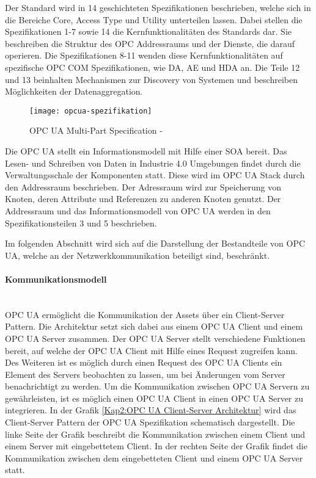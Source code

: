 Der Standard wird in 14 geschichteten Spezifikationen beschrieben, welche sich in die Bereiche Core, Access Type und Utility unterteilen lassen. Dabei stellen die Spezifikationen 1-7 sowie 14 die Kernfunktionalitäten des Standards dar. Sie beschreiben die Struktur des OPC Addressraums und der Dienste, die darauf operieren. Die Spezifikationen 8-11 wenden diese Kernfunktionalitäten auf spezifische OPC COM Spezifikationen, wie \ac{DA}, \ac{AE} und \ac{HDA} an. Die Teile 12 und 13 beinhalten Mechanismen zur Discovery von Systemen und beschreiben Möglichkeiten der Datenaggregation.

\begin{figure}[h]
  \centering
  \texttt{[image: opcua-spezifikation]}
  \caption{OPC UA Multi-Part Specification - \cite{opcpt1}} 
  \label{Kap2:OPC UA Multi-Part Specification}
\end{figure}

\clearpage

Die \ac{OPC UA} stellt ein Informationsmodell mit Hilfe einer \ac{SOA} bereit. Das Lesen- und Schreiben von Daten in Industrie 4.0 Umgebungen findet durch die Verwaltungsschale der Komponenten statt. Diese wird im \ac{OPC UA} Stack durch den Addressraum beschrieben. Der Adressraum wird zur Speicherung von Knoten, deren Attribute und Referenzen zu anderen Knoten genutzt. Der Addressraum und das Informationsmodell von \ac{OPC UA} werden in den Spezifikationsteilen 3 \cite{opcpc3} und 5 \cite{opcpt5} beschrieben.

Im folgenden Abschnitt wird sich auf die Darstellung der Bestandteile von \ac{OPC UA}, welche an der Netzwerkkommunikation beteiligt sind, beschränkt.

\paragraph{Kommunikationsmodell}\mbox{}\\
\ac{OPC UA} ermöglicht die Kommunikation der Assets über ein Client-Server Pattern. Die Architektur setzt sich dabei aus einem \ac{OPC UA} Client und einem \ac{OPC UA} Server zusammen. Der \ac{OPC UA} Server stellt verschiedene Funktionen bereit, auf welche der \ac{OPC UA} Client mit Hilfe eines Request zugreifen kann. Des Weiteren ist es möglich durch einen Request des \ac{OPC UA} Clients ein Element des Servers beobachten zu lassen, um bei Änderungen vom Server benachrichtigt zu werden. Um die Kommunikation zwischen \ac{OPC UA} Servern zu gewährleisten, ist es möglich einen \ac{OPC UA} Client in einen \ac{OPC UA} Server zu integrieren. In der Grafik \autoref{Kap2:OPC UA Client-Server Architektur} wird das Client-Server Pattern der \ac{OPC UA} Spezifikation schematisch dargestellt. Die linke Seite der Grafik beschreibt die Kommunikation zwischen einem Client und einem Server mit eingebettetem Client. In der rechten Seite der Grafik findet die Kommunikation zwischen dem eingebetteten Client und einem \ac{OPC UA} Server statt.

